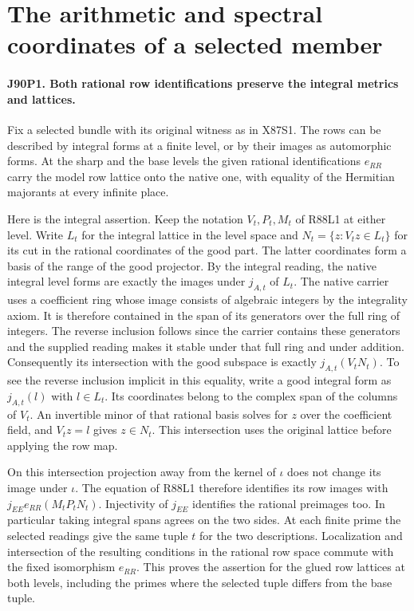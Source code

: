 \section{The arithmetic and spectral coordinates of a selected member}

\paragraph{J90P1. Both rational row identifications preserve the integral metrics and lattices.}
Fix a selected bundle with its original witness as in X87S1.
The rows can be described by integral forms at a finite level, or by
their images as automorphic forms. At the sharp and the base levels
the given rational identifications $e_{RR}$ carry the model row
lattice onto the native one, with equality of the Hermitian
majorants at every infinite place.

Here is the integral assertion. Keep the notation $V_t,P_t,M_t$
of R88L1 at either level. Write $L_t$ for the integral lattice in
the level space and $N_t=\{z: V_tz\in L_t\}$ for its cut in
the rational coordinates of the good part. The latter coordinates
form a basis of the range of the good projector. By the integral
reading, the native integral level forms are exactly the images
under $j_{A,t}$ of $L_t$. The native carrier uses a coefficient ring whose image consists of
algebraic integers by the integrality axiom. It is therefore contained
in the span of its generators over the full ring of integers. The
reverse inclusion follows since the carrier contains these generators
and the supplied reading makes it stable under that full ring and
under addition. Consequently its intersection with the good subspace is
exactly $j_{A,t}(V_tN_t)$. To see the reverse inclusion implicit
in this equality, write a good integral form as $j_{A,t}(l)$
with $l\in L_t$. Its coordinates belong to the complex span of
the columns of $V_t$. An invertible minor of that rational basis
solves for $z$ over the coefficient field, and $V_tz=l$ gives
$z\in N_t$. This intersection uses the original lattice before
applying the row map.

On this intersection projection away from the kernel of $\iota$
does not change its image under $\iota$. The equation of R88L1
therefore identifies its row images with
$j_{EE}e_{RR}(M_tP_tN_t)$. Injectivity of $j_{EE}$ identifies
the rational preimages too. In particular taking integral spans
agrees on the two sides. At each finite prime the selected readings
give the same tuple $t$ for the two descriptions. Localization and
intersection of the resulting conditions in the rational row space
commute with the fixed isomorphism $e_{RR}$. This proves the
assertion for the glued row lattices at both levels, including the
primes where the selected tuple differs from the base tuple.

